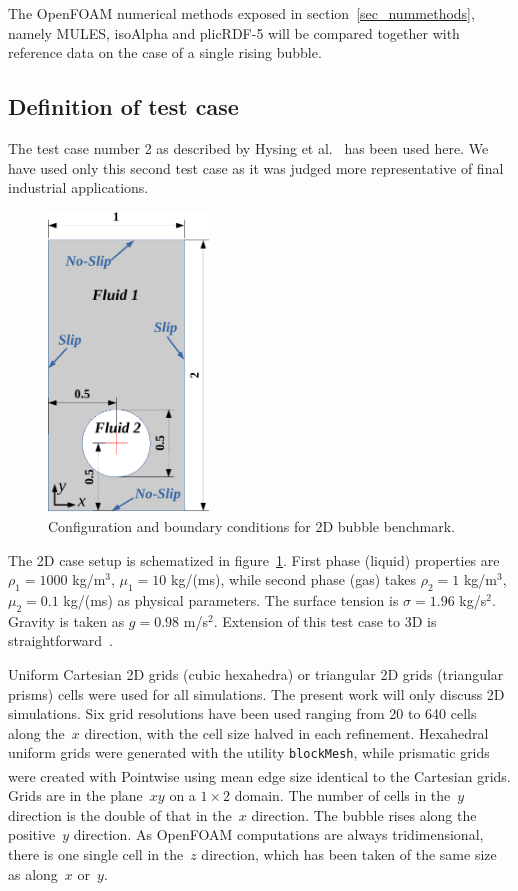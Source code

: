 \documentclass[review]{elsarticle}
\begin{document}
The OpenFOAM numerical methods exposed in section~\ref{sec_nummethods}, namely MULES, isoAlpha and plicRDF-5 will be compared together with reference data on the case of a single rising bubble. 

\subsection{Definition of test case}\label{sec_hysingcasedef}
The test case number 2 as described by Hysing et al.~\cite{Hysing2009} has been used here. We have used only this second test case as it was judged more representative of final industrial applications. 
\begin{figure}[!h]
\begin{center}
 \vspace{-1mm}
 \includegraphics[width=4.25cm]{figures/benchmark_scheme.pdf}
 \vspace{-7mm}
\end{center}
\caption{Configuration and boundary conditions for 2D bubble benchmark.}
\label{benchmark_scheme}
\end{figure}
The 2D case setup is schematized in figure~\ref{benchmark_scheme}. First phase (liquid) properties are $\rho_1=1000$ kg/m$^3$, $\mu_1=10$ kg/(ms), while second phase (gas) takes $\rho_2=1$ kg/m$^3$, $\mu_2=0.1$ kg/(ms) as physical parameters. The surface tension is $\sigma=1.96$ kg/s$^2$. Gravity is taken as $g=0.98$ m/s$^2$. Extension of this test case to 3D is straightforward~\cite{Adelsberger2014}.

Uniform Cartesian 2D grids (cubic hexahedra) or triangular 2D grids (triangular prisms) cells were used for all simulations. The present work will only discuss 2D simulations. Six grid resolutions have been used ranging from 20 to 640 cells along the~$x$ direction, with the cell size halved in each refinement. Hexahedral uniform grids were generated with the utility \verb+blockMesh+, while prismatic grids were created with Pointwise\textsuperscript{\textregistered} using mean edge size identical to the Cartesian grids. Grids are in the plane~$xy$ on a $1\times 2$ domain. The number of cells in the~$y$ direction is the double of that in the~$x$ direction. The bubble rises along the positive~$y$ direction. As OpenFOAM computations are always tridimensional, there is one single cell in the~$z$ direction, which has been taken of the same size as along~$x$ or~$y$.
\end{document}
